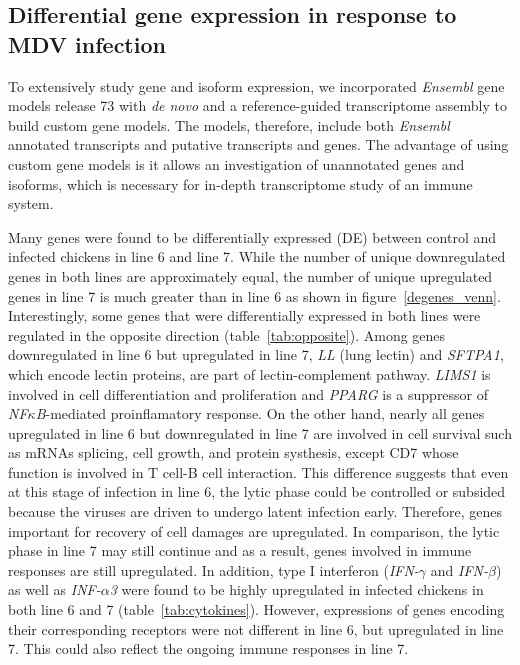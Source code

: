 \documentclass[10pt]{article}
\begin{document}
\subsection*{Differential gene expression in response to MDV infection}

To extensively study gene and isoform expression, we incorporated \textit{Ensembl} gene models
release 73 with \textit{de novo} and a reference-guided transcriptome assembly to build custom
gene models.
The models, therefore, include both \textit{Ensembl} annotated transcripts
and putative transcripts and genes.
The advantage of using custom gene models is it allows an investigation of unannotated genes and
isoforms, which is necessary for in-depth transcriptome study of an immune system.

Many genes were found to be differentially expressed (DE) between control and infected
chickens in line 6 and line 7.
While the number of unique downregulated genes in both lines are approximately equal,
the number of unique upregulated genes in line 7 is much greater than in line 6 as shown
in figure~\ref{degenes_venn}.
Interestingly, some genes that were differentially expressed in both lines were
regulated in the opposite direction (table~\ref{tab:opposite}).
Among genes downregulated in line 6 but upregulated in line 7,
\textit{LL} (lung lectin) and \textit{SFTPA1}, which encode lectin proteins, are part of
lectin-complement pathway.
\textit{LIMS1} is involved in cell differentiation and proliferation and
\textit{PPARG} is a suppressor of \textit{NF$\kappa$B}-mediated proinflamatory response.
On the other hand, nearly all genes upregulated in line 6 but downregulated in line 7
are involved in cell survival such as mRNAs splicing, cell growth, and protein systhesis,
except CD7 whose function is involved in T cell-B cell interaction.
This difference suggests that even at this stage of infection in line 6, the lytic phase 
could be controlled or subsided because the viruses are driven to undergo latent infection early.
Therefore, genes important for recovery of cell damages are upregulated.
In comparison, the lytic phase in line 7 may still continue and as a result, genes involved in
immune responses are still upregulated.
In addition, type I interferon (\textit{IFN-$\gamma$} and \textit{IFN-$\beta$}) as well as \textit{INF-$\alpha$3} were found to be highly
upregulated in infected chickens in both line 6 and 7 (table~\ref{tab:cytokines}).
However, expressions of genes encoding their corresponding receptors
were not different in line 6, but upregulated in line 7.
This could also reflect the ongoing immune responses in line 7.
\end{document}
